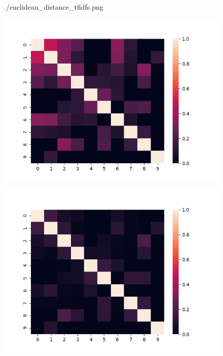 \documentclass{jsarticle}
\begin{document}
\begin{figure}[h]
\begin{minipage}[b]{0.50\linewidth}
  {./euclidean_distance_tfidfs.png}
  \label{euclidean_tfidf}
 \end{minipage}
 \begin{minipage}[b]{0.50\linewidth}
  \centering
  \includegraphics[keepaspectratio, scale=0.42]
  {./cosine_similarity_bows.png}
  \label{cosine_bow}
 \end{minipage}
 \begin{minipage}[b]{0.50\linewidth}
  \centering
  \includegraphics[keepaspectratio, scale=0.42]
  {./cosine_similarity_tfidfs.png}
  \label{cosine_tfidf}
 \end{minipage}
\end{figure}
\end{document}
